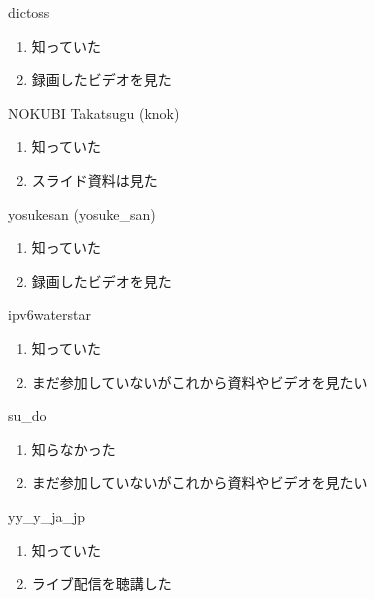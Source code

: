 \begin{prework}{ dictoss }
  \begin{enumerate}
  \item 知っていた
  \item 録画したビデオを見た
  \end{enumerate}
\end{prework}

\begin{prework}{ NOKUBI Takatsugu (knok) }
  \begin{enumerate}
  \item 知っていた
  \item スライド資料は見た
  \end{enumerate}
\end{prework}

\begin{prework}{ yosukesan (yosuke\_san) }
  \begin{enumerate}
  \item 知っていた
  \item 録画したビデオを見た
  \end{enumerate}
\end{prework}

\begin{prework}{ ipv6waterstar }
  \begin{enumerate}
  \item 知っていた
  \item まだ参加していないがこれから資料やビデオを見たい
  \end{enumerate}
\end{prework}

\begin{prework}{ su\_do }
  \begin{enumerate}
  \item 知らなかった
  \item まだ参加していないがこれから資料やビデオを見たい
  \end{enumerate}
\end{prework}

\begin{prework}{ yy\_y\_ja\_jp }
  \begin{enumerate}
  \item 知っていた
  \item ライブ配信を聴講した
  \end{enumerate}
\end{prework}
